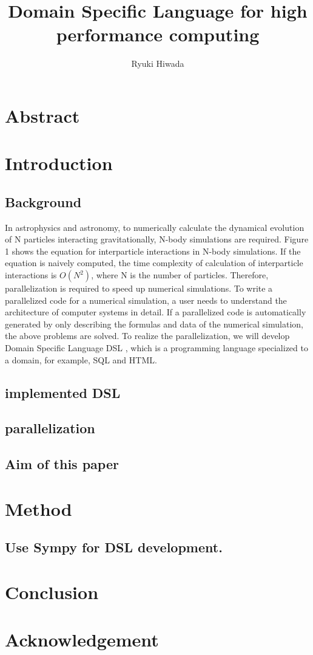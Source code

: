 \documentclass[twocolumn, a4j]{article}
\author{Ryuki Hiwada}
\title{Domain Specific Language for high performance computing}
\begin{document}
\maketitle
\section{Abstract}
\section{Introduction}
\subsection{Background}
In astrophysics and astronomy, to numerically calculate the dynamical 
evolution of N particles interacting gravitationally, N-body simulations 
are required. Figure 1 shows the equation for interparticle interactions 
in N-body simulations. If the equation is naively computed, the time
complexity of calculation of interparticle interactions is 
\begin{math}O(N^2) \end{math}, where 
N is the number of particles. Therefore, parallelization is required to
speed up numerical simulations. To write a parallelized code for a 
numerical simulation, a user needs to understand the architecture of 
computer systems in  detail. If a parallelized code is automatically
generated by only describing the formulas and data of the numerical
simulation, the above problems are solved. To realize the parallelization,
we will develop Domain Specific Language \lparen DSL \rparen, which is a 
programming language specialized to a domain, for example, SQL and HTML.
\subsection{implemented DSL}


\subsection{parallelization}

\subsection{Aim of this paper}

\section{Method}
\subsection{Use Sympy for DSL development.}

\section{Conclusion}
\section{Acknowledgement}

\end{document}
